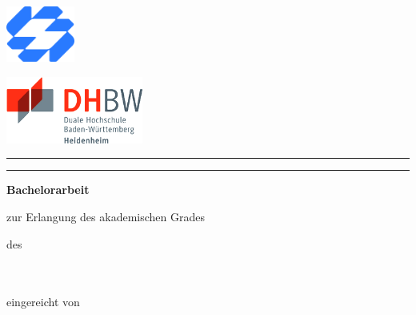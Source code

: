 \begin{titlepage}
	\noindent
	\begin{minipage}{0.45\textwidth}
		\includegraphics[width=2.25cm]{deckblatt/logos/company_logo.png}
	\end{minipage}
	\hfill
	\begin{minipage}{0.45\textwidth}
		\raggedleft
		\includegraphics[width=4.5cm]{deckblatt/logos/dhbw_logo.png}
	\end{minipage}

	\centering
	\vspace*{0.4cm}

	\begin{center}
		\rule{\textwidth}{0.6pt}
	\end{center}

	{\large\bfseries \projecttitle \par}

	\begin{center}
		\rule{\textwidth}{0.6pt}
	\end{center}

	{\large\bfseries Bachelorarbeit\par}

    \vspace{0.4cm}
    {\normalsize zur Erlangung des akademischen Grades\\[0.1cm]
    \textbf{\degree}}

	\vspace{0.4cm}
	{\normalsize des \degreeprogram\\
		\faculty\\
		\university\\
		\universitycity\par}

	\vspace{0.4cm}
	{\normalsize eingereicht von\\[0.1cm]
		\textbf{\studentname} \\
		\textbf{\studentaddress} \\
		\textbf{\studentcity} \\
	}


\end{titlepage}
